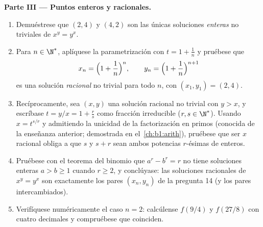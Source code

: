 \begin{problem}
\medskip
\noindent\textbf{Parte III --- Puntos enteros y racionales.}
\begin{enumerate}[resume]
  \item Demuéstrese que $(2, 4)$ y $(4, 2)$ son las únicas soluciones
        \emph{enteras} no triviales de $x^y = y^x$.
  \item Para $n \in \N^*$, aplíquese la parametrización con
        $t = 1 + \frac1n$ y pruébese que
        \[
        x_n = \Bigl(1 + \frac1n\Bigr)^{n},
        \qquad
        y_n = \Bigl(1 + \frac1n\Bigr)^{n+1}
        \]
        es una solución \emph{racional} no trivial para todo $n$, con
        $(x_1, y_1) = (2, 4)$.
  \item Recíprocamente, sea $(x, y)$ una solución racional no trivial
        con $y > x$, y escríbase $t = y/x = 1 + \frac rs$ como fracción
        irreducible ($r, s \in \N^*$). Usando $x = t^{s/r}$ y
        admitiendo la unicidad de la factorización en primos (conocida
        de la enseñanza anterior; demostrada en el~\cref{ch:b1:arith}),
        pruébese que ser $x$ racional obliga a que $s$ y $s + r$ sean
        ambos potencias $r$-ésimas de enteros.
  \item Pruébese con el teorema del binomio que $a^r - b^r = r$ no
        tiene soluciones enteras $a > b \geq 1$ cuando $r \geq 2$, y
        conclúyase: las soluciones racionales de $x^y = y^x$ son
        exactamente los pares $(x_n, y_n)$ de la pregunta 14 (y los
        pares intercambiados).
  \item Verifíquese numéricamente el caso $n = 2$: calcúlense $f(9/4)$
        y $f(27/8)$ con cuatro decimales y compruébese que coinciden.
\end{enumerate}


\end{problem}
